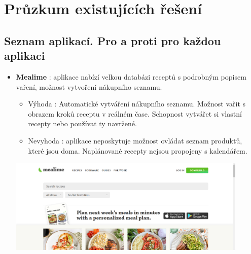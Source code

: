 \documentclass[a4paper,12pt]{article}
\begin{document}
\section*{Průzkum existujících řešení}

\subsection*{Seznam aplikací. Pro a proti pro každou aplikaci}
\begin{itemize}
    \item \textbf{Mealime} : aplikace nabízí velkou databázi receptů s podrobným popisem vaření, možnost vytvoření nákupního seznamu.
    \begin{itemize}
        \item Výhoda :  Automatické vytváření nákupního seznamu. Možnost vařit s obrazem kroků receptu v reálném čase. Schopnost vytvářet si vlastní recepty nebo používat ty navržené.
        \item Nevyhoda : aplikace neposkytuje možnost ovládat seznam produktů, které jsou doma. Naplánované recepty nejsou propojeny s kalendářem.
    \end{itemize}
    \includegraphics[width=0.9\textwidth]{mealime.png}
    


\end{itemize}
\end{document}
